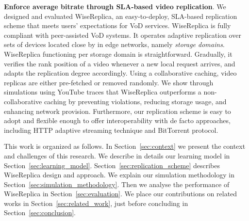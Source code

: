 \noindent
\textbf{Enforce average bitrate through SLA-based video replication}. We designed and evaluated WiseReplica, an easy-to-deploy, SLA-based replication scheme that meets users' expectations for VoD services. WiseReplica is fully compliant with peer-assisted VoD systems. It operates adaptive replication over sets of devices located close by in edge networks, namely \emph{storage domains}. WiseReplica functioning per storage domain is straightforward. Gradually, it verifies the rank position of a video whenever a new local request arrives, and adapts the replication degree accordingly. Using a collaborative caching, video replicas are either pre-fetched or removed randomly. We show through simulations using YouTube traces that WiseReplica outperforms a non-collaborative caching by preventing violations, reducing storage usage, and enhancing network provision. Furthermore, our replication scheme is easy to adopt and flexible enough to offer interoperability with de facto approaches, including HTTP adaptive streaming technique and BitTorrent protocol\cite{bittorrent_P2P_protocol}.


This work is organized as follows. In Section~\ref{sec:context} 
we present the context and challenges of this research. We describe in details our learning model in Section~\ref{sec:learning_model}. Section~\ref{sec:replication_scheme} describes WiseReplica design and approach. We explain our simulation methodology in Section~\ref{sec:simulation_methodology}. Then we analyse the performance of WiseReplica in Section~\ref{sec:evaluation}. We place our contributions on related works in Section~\ref{sec:related_work}, just before concluding in Section~\ref{sec:conclusion}.
